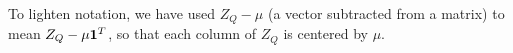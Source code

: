 \begin{remark}
To lighten notation, we have used $Z_Q - \mu$ (a vector subtracted from a matrix) to mean $Z_Q - \mu{\bf 1}^T$, so that each column of $Z_{Q}$ is centered by $\mu$.
\end{remark}



    




